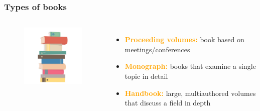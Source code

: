\documentclass[newPxFont,sthlmFooter]{beamer}
\newcommand{\fs}{\footnotesize}
\begin{document}
\begin{frame}\frametitle{Types of books}
  \begin{columns}[T,onlytextwidth]
  \begin{figure}
    \centering
    \includegraphics[width=2in]{figs/book} 
  \end{figure}
      \vspace{1cm}
  \begin{itemize}
  \fs
    \item \textcolor{orange}{\bf Proceeding volumes:} book based on meetings/conferences
    \item \textcolor{orange}{\bf Monograph:} books that examine a single topic in detail
    \item \textcolor{orange}{\bf Handbook:} large, multiauthored volumes that discuss a field in depth
  \end{itemize}
  \vspace{-2cm}
  \end{columns}
\end{frame}
\end{document}

